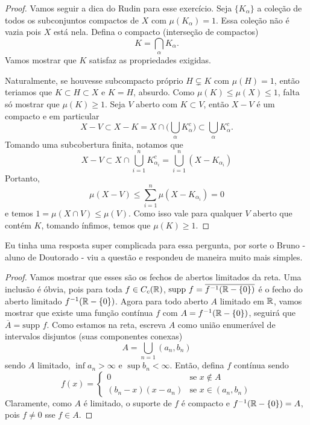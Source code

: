 \begin{problem}
    \label{prob:l4:2}
\end{problem}
\begin{proof}
    Vamos seguir a dica do Rudin para esse exercício. Seja $\{K_\alpha\}$ a coleção de todos 
    os subconjuntos compactos de $X$ com $\mu(K_\alpha) = 1$. Essa coleção não é vazia pois $X$ está nela. 
    Defina o compacto (interseção de compactos)
    $$K = \bigcap_\alpha K_\alpha.$$
    Vamos mostrar que $K$ satisfaz as propriedades exigidas. 
    
    Naturalmente, se houvesse subcompacto próprio  $H \subsetneq K$
    com $\mu(H) = 1$, então teriamos que $K \subset H \subset X$ e $K = H$, absurdo. Como $\mu(K) \leq \mu(X) \leq 1$, 
    falta só mostrar que $\mu(K) \geq 1$.
    Seja $V$ aberto com $K \subset V$, então $X - V$ é um compacto e em particular
    $$X - V \subset X - K = X \cap \bigg(\bigcup_\alpha K_\alpha^c\bigg) \subset \bigcup_\alpha K_\alpha^c.$$
    Tomando uma subcobertura finita, notamos que
    $$X - V \subset X \cap \bigcup_{i=1}^{n} K_{\alpha_i}^c = \bigcup_{i=1}^{n} (X - K_{\alpha_i})$$
    Portanto, 
    $$\mu(X - V) \leq \sum_{i=1}^{n} \mu(X - K_{\alpha_i}) = 0$$
    e temos $1 = \mu(X \cap V) \leq \mu(V)$. Como isso vale para qualquer $V$ aberto que contém $K$, tomando
    ínfimos, temos que $\mu(K) \geq 1$.
\end{proof}

\begin{problem}
    \label{prob:l4:3}
\end{problem}
Eu tinha uma resposta super complicada para essa pergunta, por sorte o Bruno - aluno de Doutorado - 
viu a questão e respondeu de maneira muito mais simples.
\begin{proof}
    Vamos mostrar que esses são os fechos de abertos limitados da reta. Uma inclusão 
    é óbvia, pois para toda $f \in C_c(\mathbb{R})$, $\text{supp } f = \overline{f^{-1}(\mathbb{R} - \{0\})}$
    é o fecho do aberto limitado $f^{-1}(\mathbb{R} - \{0\})$. Agora para todo aberto $A$ limitado em $\mathbb{R}$, vamos mostrar 
    que existe uma função contínua $f$ com $A = f^{-1}(\mathbb{R} - \{0\})$, seguirá que $\overline{A} = \text{supp }f$.
    Como estamos na reta, escreva $A$ como união enumerável de intervalos disjuntos (suas componentes conexas)
    $$A = \bigcup_{n=1} (a_n, b_n)$$
    sendo $A$ limitado, $\inf a_n > \infty$ e $\sup b_n < \infty$. Então, defina $f$ contínua sendo
    $$f(x) = \begin{cases}
        0 & \text{se } x \not \in A\\
        (b_n - x)(x - a_n) & \text{se } x \in (a_n, b_n)
    \end{cases}$$
    Claramente, como $A$ é limitado, o suporte de $f$ é compacto e $f^{-1}(\mathbb{R} - \{0\}) = A$, pois $f \neq 0$ sse $f \in A$.
\end{proof}

\begin{problem}
    \label{prob:l4:4}
\end{problem}

\begin{problem}
    \label{prob:l4:5}
\end{problem}